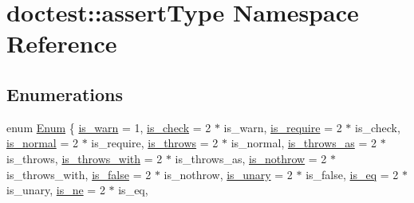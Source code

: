\hypertarget{namespacedoctest_1_1assertType}{}\section{doctest\+:\+:assert\+Type Namespace Reference}
\label{namespacedoctest_1_1assertType}
\subsection*{Enumerations}
\begin{DoxyCompactItemize}
\item 
enum \hyperlink{namespacedoctest_1_1assertType_ae1bb5bed722f34f1c38b83cb19d326d3}{Enum} \{ \newline
\hyperlink{namespacedoctest_1_1assertType_ae1bb5bed722f34f1c38b83cb19d326d3a2dd798b430ccf956bc48c3b48bb4e570}{is\+\_\+warn} = 1, 
\hyperlink{namespacedoctest_1_1assertType_ae1bb5bed722f34f1c38b83cb19d326d3a9ca6ff629647f2a90d4c01ce68800590}{is\+\_\+check} = 2 $\ast$ is\+\_\+warn, 
\hyperlink{namespacedoctest_1_1assertType_ae1bb5bed722f34f1c38b83cb19d326d3aff8fa549e941fb7ca7adcd49d9ffdf6d}{is\+\_\+require} = 2 $\ast$ is\+\_\+check, 
\hyperlink{namespacedoctest_1_1assertType_ae1bb5bed722f34f1c38b83cb19d326d3a34258afd98e569142dfb5b0a2c468436}{is\+\_\+normal} = 2 $\ast$ is\+\_\+require, 
\newline
\hyperlink{namespacedoctest_1_1assertType_ae1bb5bed722f34f1c38b83cb19d326d3a922a5fb427724cad963fb3dd789a8114}{is\+\_\+throws} = 2 $\ast$ is\+\_\+normal, 
\hyperlink{namespacedoctest_1_1assertType_ae1bb5bed722f34f1c38b83cb19d326d3a278ed7bf7e411c11e25ad8a60933ef34}{is\+\_\+throws\+\_\+as} = 2 $\ast$ is\+\_\+throws, 
\hyperlink{namespacedoctest_1_1assertType_ae1bb5bed722f34f1c38b83cb19d326d3ab79f3f076e62c260e77febd914bb82c3}{is\+\_\+throws\+\_\+with} = 2 $\ast$ is\+\_\+throws\+\_\+as, 
\hyperlink{namespacedoctest_1_1assertType_ae1bb5bed722f34f1c38b83cb19d326d3a0ad6f07c0273891b1c3f2fd84fe666dc}{is\+\_\+nothrow} = 2 $\ast$ is\+\_\+throws\+\_\+with, 
\newline
\hyperlink{namespacedoctest_1_1assertType_ae1bb5bed722f34f1c38b83cb19d326d3a6539bad84e35008dc4a4a2c2d0793318}{is\+\_\+false} = 2 $\ast$ is\+\_\+nothrow, 
\hyperlink{namespacedoctest_1_1assertType_ae1bb5bed722f34f1c38b83cb19d326d3adfaee7d6a907d7681e53e0e91734e058}{is\+\_\+unary} = 2 $\ast$ is\+\_\+false, 
\hyperlink{namespacedoctest_1_1assertType_ae1bb5bed722f34f1c38b83cb19d326d3a7010ae6142f085a3bfd85caa251c7499}{is\+\_\+eq} = 2 $\ast$ is\+\_\+unary, 
\hyperlink{namespacedoctest_1_1assertType_ae1bb5bed722f34f1c38b83cb19d326d3a3d624cd25af4d9bb1c29bd84f356e58d}{is\+\_\+ne} = 2 $\ast$ is\+\_\+eq, 

\end{DoxyCompactItemize}
